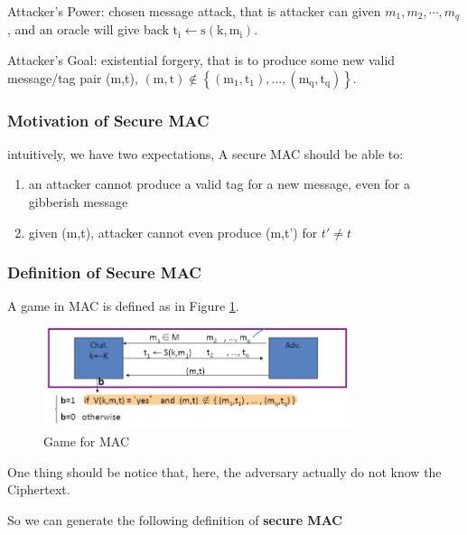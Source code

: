 Attacker's Power: chosen message attack, that is attacker can given $m_1, m_2, \cdots, m_q$, and an oracle will give back $\mathrm{t}_{\mathrm{i}} \leftarrow \mathrm{s}\left(\mathrm{k}, \mathrm{m}_{\mathrm{i}}\right)$.

Attacker's Goal: existential forgery, that is to produce some new valid message/tag pair (m,t), $(\mathrm{m}, \mathrm{t}) \notin\left\{\left(\mathrm{m}_{1}, \mathrm{t}_{1}\right), \ldots,\left(\mathrm{m}_{\mathrm{q}}, \mathrm{t}_{\mathrm{q}}\right)\right\}$.


\subsubsection{Motivation of Secure MAC}

intuitively, we have two expectations, A secure MAC should be able to:
\begin{enumerate} [itemsep=2pt,topsep=0pt,parsep=0pt]
    \item an attacker cannot produce a valid tag for a new message,  even for a gibberish message
    \item given (m,t), attacker cannot even produce (m,t') for $t' \neq t$
\end{enumerate}

\subsubsection{Definition of Secure MAC}

A game in MAC is defined as in Figure \ref{fig: Lecture 4: Game for MAC}.

\begin{figure}[h]
    \centering
    \includegraphics[width=0.8\textwidth]{Stanford_Crypto_1/fig/04_Integrity/Game for MAC.png}
    \caption{Game for MAC}
    \label{fig: Lecture 4: Game for MAC}
\end{figure}

One thing should be notice that, here, the adversary actually do not know the Ciphertext.

So we can generate the following definition of \textbf{secure MAC}
 
